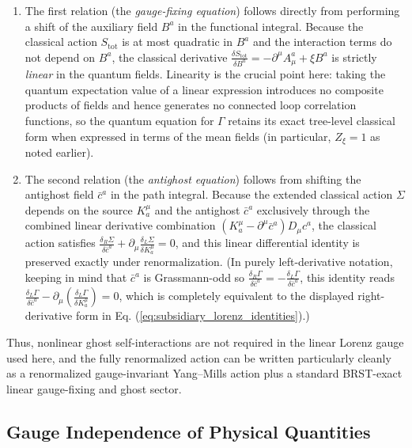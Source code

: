 \begin{enumerate}
    \item The first relation (the \textit{gauge-fixing equation}) follows directly from performing a shift of the auxiliary field \(B^a\) in the functional integral. Because the classical action \(S_{\text{tot}}\) is at most quadratic in \(B^a\) and the interaction terms do not depend on \(B^a\), the classical derivative \(\frac{\delta S_{\text{tot}}}{\delta B^a} = -\partial^\mu A_\mu^a + \xi B^a\) is strictly \textit{linear} in the quantum fields. Linearity is the crucial point here: taking the quantum expectation value of a linear expression introduces no composite products of fields and hence generates no connected loop correlation functions, so the quantum equation for \(\Gamma\) retains its exact tree-level classical form when expressed in terms of the mean fields (in particular, \(Z_\xi = 1\) as noted earlier).
    \item The second relation (the \textit{antighost equation}) follows from shifting the antighost field \(\bar{c}^a\) in the path integral. Because the extended classical action \(\Sigma\) depends on the source \(K_a^\mu\) and the antighost \(\bar{c}^a\) exclusively through the combined linear derivative combination \((K_a^\mu - \partial^\mu \bar{c}^a) D_\mu c^a\), the classical action satisfies \(\frac{\delta_R \Sigma}{\delta \bar{c}^a} + \partial_\mu \frac{\delta_L \Sigma}{\delta K_a^\mu} = 0\), and this linear differential identity is preserved exactly under renormalization. (In purely left-derivative notation, keeping in mind that \(\bar{c}^a\) is Grassmann-odd so \(\frac{\delta_R \Gamma}{\delta \bar{c}^a} = -\frac{\delta_L \Gamma}{\delta \bar{c}^a}\), this identity reads \(\frac{\delta_L \Gamma}{\delta \bar{c}^a} - \partial_\mu \left(\frac{\delta_L \Gamma}{\delta K_a^\mu}\right) = 0\), which is completely equivalent to the displayed right-derivative form in Eq. (\ref{eq:subsidiary_lorenz_identities}).)
\end{enumerate}
Thus, nonlinear ghost self-interactions are not required in the linear Lorenz gauge used here, and the fully renormalized action can be written particularly cleanly as a renormalized gauge-invariant Yang--Mills action plus a standard BRST-exact linear gauge-fixing and ghost sector.

\subsection{Gauge Independence of Physical Quantities}

